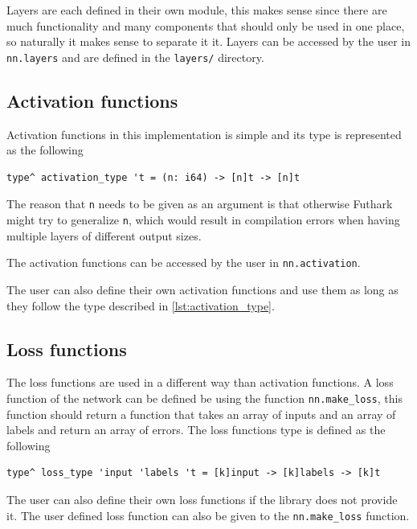 Layers are each defined in their own module, this makes sense since there are much functionality and many components that should only be used in one place, so naturally it makes sense to separate it it.
Layers can be accessed by the user in \texttt{nn.layers} and are defined in the \texttt{layers/} directory.

\subsection{Activation functions}

Activation functions in this implementation is simple and its type is represented as the following

\begin{lstlisting}[caption=The type definition of activation functions., label={lst:activation_type}]
type^ activation_type 't = (n: i64) -> [n]t -> [n]t
\end{lstlisting}

The reason that \texttt{n} needs to be given as an argument is that otherwise Futhark might try to generalize \texttt{n}, which would result in compilation errors when having multiple layers of different output sizes.

The activation functions can be accessed by the user in \texttt{nn.activation}.

The user can also define their own activation functions and use them as long as they follow the type described in \autoref{lst:activation_type}.

\subsection{Loss functions}

The loss functions are used in a different way than activation functions. A loss function of the network can be defined be using the function \texttt{nn.make\_loss}, this function should return a function that takes an array of inputs and an array of labels and return an array of errors. The loss functions type is defined as the following

\begin{lstlisting}
type^ loss_type 'input 'labels 't = [k]input -> [k]labels -> [k]t
\end{lstlisting}

The user can also define their own loss functions if the library does not provide it. The user defined loss function can also be given to the \texttt{nn.make\_loss} function.

